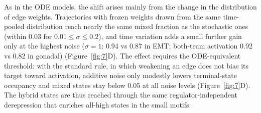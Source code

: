 \documentclass[11pt]{article}
\providecommand{\DIFaddtex}[1]{{\protect\color{red}#1}} %
\providecommand{\DIFdeltex}[1]{} %
\providecommand{\DIFaddbegin}{} %
\providecommand{\DIFaddend}{} %
\providecommand{\DIFdelbegin}{} %
\providecommand{\DIFdelend}{} %
\providecommand{\DIFadd}[1]{\texorpdfstring{\DIFaddtex{#1}}{#1}} %
\providecommand{\DIFdel}[1]{\texorpdfstring{\DIFdeltex{#1}}{}} %
\providecommand{\DIFaddincludegraphics}[2][]{\DIFOincludegraphics[#1]{#2}} %
\providecommand{\DIFdelincludegraphics}[2][]{}
\DeclareRobustCommand{\DIFaddbegin}{\DIFOaddbegin \let\includegraphics\DIFaddincludegraphics} %
\DeclareRobustCommand{\DIFaddend}{\DIFOaddend \let\includegraphics\DIFOincludegraphics} %
\DeclareRobustCommand{\DIFdelbegin}{\DIFOdelbegin \let\includegraphics\DIFdelincludegraphics} %
\DeclareRobustCommand{\DIFdelend}{\DIFOaddend \let\includegraphics\DIFOincludegraphics} %
\begin{document}
\DIFadd{As in the ODE models, the shift arises mainly from the change in the distribution of edge weights. Trajectories with frozen weights drawn from the same time-pooled distribution reach nearly the same mixed fraction as the stochastic ones (within 0.03 for $0.01 \le \sigma \le 0.2$), and time variation adds a small further gain only at the highest noise ($\sigma = 1$: 0.94 vs 0.87 in EMT; both-team activation 0.92 vs 0.82 in gonadal) (}\DIFaddend Figure~\ref{fig:7}\DIFdelbegin \DIFdel{C, \ref{fig:7S2}A). Multiplicative and stationary noise produce minimal disruption to the phenotypic landscape, with trajectories retaining high terminal state frequency similar to the unperturbed network across }\DIFdelend \DIFaddbegin \DIFadd{D). The effect requires the ODE-equivalent threshold: with the standard rule, in which weakening an edge does not bias its target toward activation, additive noise only modestly lowers terminal-state occupancy and mixed states stay below 0.05 at }\DIFaddend all noise levels \DIFdelbegin \DIFdel{tested }\DIFdelend (Figure~\ref{fig:7}D\DIFdelbegin \DIFdel{, \ref{fig:7S2}B, C). }\DIFdelend \DIFaddbegin \DIFadd{). The hybrid states are thus reached through the same regulator-independent derepression that enriches all-high states in the small motifs.
}\DIFaddend 
\end{document}

